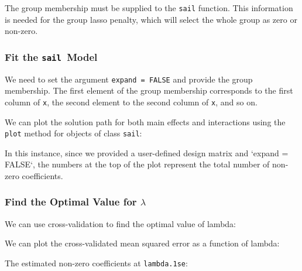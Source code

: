 \documentclass[12pt,letter]{article}\usepackage[]{graphicx}\usepackage[]{color}
\newcommand{\sail}{\texttt{sail}}
\begin{document}
The group membership must be supplied to the \texttt{sail} function. This information is needed for the group lasso penalty, which will select the whole group as zero or non-zero.

\subsubsection{Fit the \sail ~Model}

We need to set the argument \texttt{expand = FALSE} and provide the group membership. The first element of the group membership corresponds to the first column of \texttt{x}, the second element to the second column of \texttt{x}, and so on. 



We can plot the solution path for both main effects and interactions using the \texttt{plot} method for objects of class \texttt{sail}:



In this instance, since we provided a user-defined design matrix and `expand = FALSE`, the numbers at the top of the plot represent the total number of non-zero coefficients. 


\subsubsection{Find the Optimal Value for $\lambda$}

We can use cross-validation to find the optimal value of lambda:



We can plot the cross-validated mean squared error as a function of lambda:




The estimated non-zero coefficients at \texttt{lambda.1se}:
\end{document}
